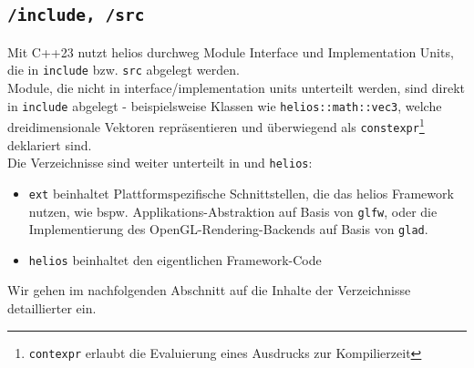 \subsection*{\texttt{/include, /src}}
Mit C++23 nutzt helios durchweg Module Interface und Implementation Units, die in \texttt{include} bzw. \texttt{src} abgelegt werden.\\
Module, die nicht in interface/implementation units unterteilt werden, sind direkt in \texttt{include} abgelegt - beispielsweise Klassen wie \texttt{helios::math::vec3}, welche dreidimensionale Vektoren repräsentieren und überwiegend als \texttt{constexpr}\footnote{
\texttt{contexpr} erlaubt die Evaluierung eines Ausdrucks zur Kompilierzeit
} deklariert sind.\\
Die Verzeichnisse sind weiter unterteilt in  und \texttt{helios}:
\begin{itemize}
    \itemsep0.5em
    \item \texttt{ext} beinhaltet Plattformspezifische Schnittstellen, die das helios Framework nutzen, wie bspw. Applikations-Abstraktion auf Basis von \texttt{glfw}, oder die Implementierung des OpenGL-Rendering-Backends auf Basis von \texttt{glad}.
    \item \texttt{helios} beinhaltet den eigentlichen Framework-Code
\end{itemize}

Wir gehen im nachfolgenden Abschnitt auf die Inhalte der Verzeichnisse detaillierter ein.